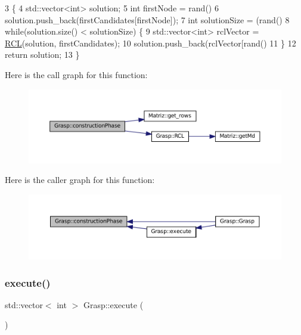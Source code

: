 \begin{DoxyCode}
3                                                                        \{
4    std::vector<int> solution;
5    \textcolor{keywordtype}{int} firstNode = rand() %
6    solution.push\_back(firstCandidates[firstNode]);
7    \textcolor{keywordtype}{int} solutionSize = (rand() %
8    \textcolor{keywordflow}{while}(solution.size() < solutionSize) \{
9      std::vector<int> rclVector = \hyperlink{classGrasp_ac63d4a1892472663549c77686edfed74}{RCL}(solution, firstCandidates);
10      solution.push\_back(rclVector[rand() %
11    \}
12    \textcolor{keywordflow}{return} solution;
13  \}
\end{DoxyCode}
Here is the call graph for this function\+:
\nopagebreak
\begin{figure}[H]
\begin{center}
\leavevmode
\includegraphics[width=350pt]{classGrasp_aef091e71dd747ebcb78e1ebcdcf44221_cgraph}
\end{center}
\end{figure}
Here is the caller graph for this function\+:
\nopagebreak
\begin{figure}[H]
\begin{center}
\leavevmode
\includegraphics[width=350pt]{classGrasp_aef091e71dd747ebcb78e1ebcdcf44221_icgraph}
\end{center}
\end{figure}
\mbox{\label{classGrasp_a335b063bccd26b434dda3a3a69d6d711}} 
\subsubsection{\texorpdfstring{execute()}{execute()}}
{\footnotesize\ttfamily std\+::vector$<$ int $>$ Grasp\+::execute (\begin{DoxyParamCaption}{ }\end{DoxyParamCaption})\hspace{0.3cm}{\ttfamily [virtual]}}



